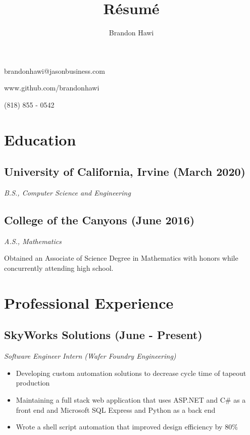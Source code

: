 \documentclass{article}
\makeatletter
\renewcommand{\maketitle}
{
\begin{flushleft}
\huge
\textbf{\theauthor}
\small

brandonhawi@jasonbusiness.com

www.github.com/brandonhawi

(818) 855 - 0542
\end{flushleft}
}
\makeatother
\begin{document}
\title{R\'esum\'e}
\author{Brandon Hawi}

\maketitle
\vspace{-0.1in}
\section{Education}

\subsection{University of California, Irvine (March 2020)}
\noindent\textit{B.S., Computer Science and Engineering}

\subsection{College of the Canyons (June 2016)}
\noindent\textit{A.S., Mathematics}

Obtained an Associate of Science Degree in Mathematics with honors while concurrently attending
high school.

\section{Professional Experience}

%
%
%

\subsection{SkyWorks Solutions (June - Present)}

\noindent\textit{Software Engineer Intern (Wafer Foundry Engineering)}
\begin{itemize}
	\setlength\itemsep{0em}
	\item Developing custom automation solutions to decrease cycle time of tapeout production
	\item Maintaining a full stack web application that uses ASP.NET and C\# as a front end and Microsoft SQL Express and Python as a back end
	\item Wrote a shell script automation that improved design efficiency by 80\%
\end{itemize}
\end{document}
